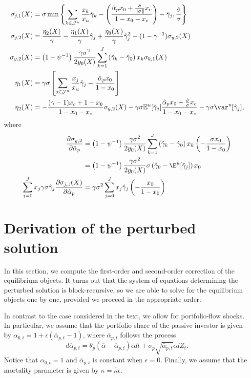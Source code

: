 \begin{align}
\sigma_{j,1}(X) &= \sigma\min\left\{ \sum_{k\in\mathcal{J}^u} \frac{x_k}{x_u} \hat{\gamma}_k -\left(\frac{\hat{\alpha}_p  x_0+\frac{\hat{\sigma}}{\|\sigma\|} x_c }{1-x_0-x_c}\right)- \hat{\gamma}_j  ,\frac{\hat{\sigma}}{\sigma}  \right\}\\
\sigma_{j,2}(X) &= \frac{\eta_2(X)}{\gamma} - \frac{\eta_1(X)}{\gamma}\hat{\gamma}_j + \frac{\eta_0(X)}{\gamma}\hat{\gamma}_j^2 - (1-\gamma^{-1})   \sigma_{y,2}(X)\\
\sigma_{y,2}(X)  &= \left (1-\psi^{-1}\right )\frac{\gamma\sigma^2}{2 y_{0}(X)} \sum_{k=1}^J \left( \hat{\gamma}_k - \hat{\gamma}_0  \right) x_k \sigma_{k,1}(X)\\
\eta_1(X) &= \gamma \sigma \left[\sum_{j\in\mathcal{J}^u} \frac{x_j}{x_u} \hat{\gamma}_j -\frac{\hat{\alpha}_p  x_0}{1-x_0}\right]\\
\eta_2(X) &=  - \frac{(\gamma-1) x_c + 1-x_0}{1-x_0-x_c} \sigma_{y,2}(X) - \gamma \sigma \mathbb{E}^u[\hat{\gamma}_j] \frac{ \hat{\alpha}_p x_0+ \frac{\hat{\sigma}}{\sigma}x_c }{1-x_0-x_c} - \gamma \sigma \var^u[\hat{\gamma}_j],
\end{align}
where
\begin{align}
\frac{\partial \sigma_{y,2}}{\partial \hat{\alpha}_p} &= \left (1-\psi^{-1}\right )\frac{\gamma\sigma^2}{2 y_{0}(X)} \sum_{k=1}^J \left( \hat{\gamma}_k - \hat{\gamma}_0  \right) x_k \left(- \frac{\sigma x_0}{1-x_0} \right)\nonumber\\
&=\left (1-\psi^{-1}\right )\frac{\gamma\sigma^2}{2 y_{0}(X)}\sigma\left(\hat{\gamma}_0-\E^u[\hat{\gamma}_j]\right)x_0\\
\sum_{j=0}^J x_{j}\gamma \sigma \hat{\gamma}_j \frac{\partial \sigma_{j,1}(X)}{\partial \hat{\alpha}_p} &= \gamma \sigma^2 \sum_{j=0}^J x_j \hat{\gamma}_j \left( -\frac{x_0}{1-x_0} \right)
\end{align}

\section{Derivation of the perturbed solution}

In this section, we compute the first-order and second-order correction of the equilibrium objects. It turns out that the system of equations determining the perturbed solution is block-recursive, so we are able to solve for the equilibrium objects one by one, provided we proceed in the appropriate order.

In contrast to the case considered in the text, we allow for portfolio-flow shocks. In particular, we assume that the portfolio share of the passive investor is given by $\alpha_{0,t} = 1 + \epsilon (\overline{\alpha}_{p,t} -1)$, where $\overline{\alpha}_{p,t}$ follows the process 
\begin{equation}
    d \overline{\alpha}_{p,t} = \theta_p (\overline{\alpha} - \overline{\alpha}_{p,t}) \epsilon dt + \sigma_{p} \sqrt{\overline{\alpha}_{p,t}} \epsilon d Z_t.
\end{equation}
Notice that $\alpha_{0,t} = 1$ and $\overline{\alpha}_{p,t}$ is constant when $\epsilon = 0$. Finally, we assume that the mortality parameter is given by $\kappa = \hat{\kappa} \epsilon$.

